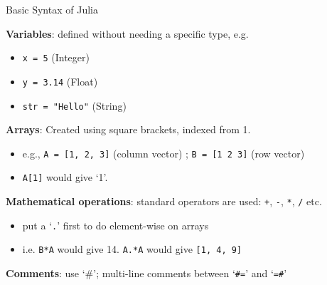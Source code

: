 \documentclass[aspectratio=169]{beamer}
\begin{document}
\begin{frame}{Basic Syntax of Julia}

\textbf{Variables}: defined without needing a specific type, e.g.
    \begin{itemize}
        \item \texttt{x = 5} (Integer)
        \item \texttt{y = 3.14} (Float)
        \item \texttt{str = "Hello"} (String)
    \end{itemize}

\vspace{0.25cm}

\textbf{Arrays}: Created using square brackets, indexed from 1.
\begin{itemize}
	\item e.g., \texttt{A = [1, 2, 3]} (column vector) ; \texttt{B = [1 2 3]} (row vector)
	\item \texttt{A[1]} would give `1'.
\end{itemize}
   
\vspace{0.25cm}

\textbf{Mathematical operations}: standard operators are used:  \texttt{+}, \texttt{-}, \texttt{*}, \texttt{/} etc.
\begin{itemize}
	\item put a `\texttt{.}' first to do element-wise on arrays
	\item i.e. \texttt{B*A} would give 14. \texttt{A.*A} would give \texttt{[1, 4, 9]}
\end{itemize}

\vspace{0.25cm}

    
\textbf{Comments}: use `\#'; multi-line comments between `\texttt{\#=}' and `\texttt{=\#}'
    

\end{frame}
\end{document}
